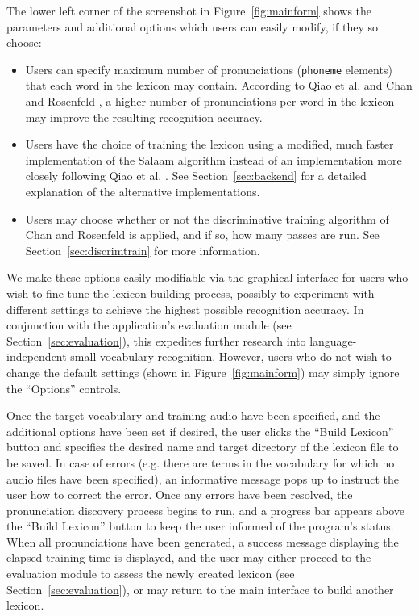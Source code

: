 \documentclass[11pt]{article}
\begin{document}
The lower left corner of the screenshot in Figure~\ref{fig:mainform} shows the parameters and additional options which users can easily modify, if they so choose:
\begin{itemize}
\item Users can specify maximum number of pronunciations (\texttt{phoneme} elements) that each word in the lexicon may contain. According to Qiao et al.  and Chan and Rosenfeld , a higher number of pronunciations per word in the lexicon may improve the resulting recognition accuracy.
\item Users have the choice of training the lexicon using a modified, much faster implementation of the Salaam algorithm instead of an implementation more closely following Qiao et al. . See Section~\ref{sec:backend} for a detailed explanation of the alternative implementations.
\item Users may choose whether or not the discriminative training algorithm of Chan and Rosenfeld  is applied, and if so, how many passes are run. See Section~\ref{sec:discrimtrain} for more information.
\end{itemize}
We make these options easily modifiable via the graphical interface for users who wish to fine-tune the lexicon-building process, possibly to experiment with different settings to achieve the highest possible recognition accuracy. In conjunction with the application's evaluation module (see Section~\ref{sec:evaluation}), this expedites further research into language-independent small-vocabulary recognition. However, users who do not wish to change the default settings (shown in Figure~\ref{fig:mainform}) may simply ignore the ``Options'' controls.

Once the target vocabulary and training audio have been specified, and the additional options have been set if desired, the user clicks the ``Build Lexicon'' button and specifies the desired name and target directory of the lexicon file to be saved. In case of errors (e.g. there are terms in the vocabulary for which no audio files have been specified), an informative message pops up to instruct the user how to correct the error. Once any errors have been resolved, the pronunciation discovery process begins to run, and a progress bar appears above the ``Build Lexicon'' button to keep the user informed of the program's status. When all pronunciations have been generated, a success message displaying the elapsed training time is displayed, and the user may either proceed to the evaluation module to assess the newly created lexicon (see Section~\ref{sec:evaluation}), or may return to the main interface to build another lexicon. 
\end{document}
